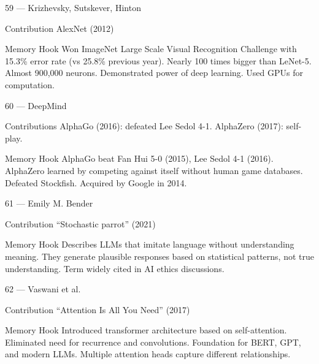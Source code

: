\documentclass[aspectratio=169,8pt]{beamer}
\begin{document}
	\begin{frame}{59 --- Krizhevsky, Sutskever, Hinton}
		\begin{block}{Contribution}
			AlexNet (2012)
		\end{block}
		\begin{block}{Memory Hook}
			Won ImageNet Large Scale Visual Recognition Challenge with 15.3\% error rate (vs 25.8\% previous year). Nearly 100 times bigger than LeNet-5. Almost 900,000 neurons. Demonstrated power of deep learning. Used GPUs for computation.
		\end{block}
	\end{frame}
	
	\begin{frame}{60 --- DeepMind}
		\begin{block}{Contributions}
			AlphaGo (2016): defeated Lee Sedol 4-1. AlphaZero (2017): self-play.
		\end{block}
		\begin{block}{Memory Hook}
			AlphaGo beat Fan Hui 5-0 (2015), Lee Sedol 4-1 (2016). AlphaZero learned by competing against itself without human game databases. Defeated Stockfish. Acquired by Google in 2014.
		\end{block}
	\end{frame}
	
	\begin{frame}{61 --- Emily M. Bender}
		\begin{block}{Contribution}
			``Stochastic parrot'' (2021)
		\end{block}
		\begin{block}{Memory Hook}
			Describes LLMs that imitate language without understanding meaning. They generate plausible responses based on statistical patterns, not true understanding. Term widely cited in AI ethics discussions.
		\end{block}
	\end{frame}
	
	\begin{frame}{62 --- Vaswani et al.}
		\begin{block}{Contribution}
			``Attention Is All You Need'' (2017)
		\end{block}
		\begin{block}{Memory Hook}
			Introduced transformer architecture based on self-attention. Eliminated need for recurrence and convolutions. Foundation for BERT, GPT, and modern LLMs. Multiple attention heads capture different relationships.
		\end{block}
	\end{frame}
	
\end{document}
